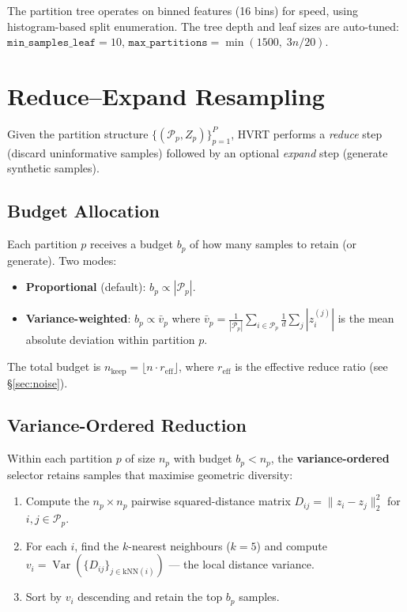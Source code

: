 \documentclass[11pt,a4paper]{article}
\newcommand{\Var}{\operatorname{Var}}
\theoremstyle{definition}
\begin{document}
The partition tree operates on binned features (16 bins) for speed, using
histogram-based split enumeration.  The tree depth and leaf sizes are
auto-tuned: $\texttt{min\_samples\_leaf} = 10$,
$\texttt{max\_partitions} = \min(1500,\; 3n / 20)$.


\section{Reduce--Expand Resampling}

Given the partition structure $\{(\mathcal{P}_p, Z_p)\}_{p=1}^{P}$, HVRT
performs a \emph{reduce} step (discard uninformative samples) followed by an
optional \emph{expand} step (generate synthetic samples).

\subsection{Budget Allocation}

Each partition $p$ receives a budget $b_p$ of how many samples to retain
(or generate).  Two modes:
\begin{itemize}[nosep]
    \item \textbf{Proportional} (default): $b_p \propto |\mathcal{P}_p|$.
    \item \textbf{Variance-weighted}: $b_p \propto \bar{v}_p$ where
        $\bar{v}_p = \frac{1}{|\mathcal{P}_p|}\sum_{i \in \mathcal{P}_p} \frac{1}{d}\sum_j |z_i^{(j)}|$
        is the mean absolute deviation within partition $p$.
\end{itemize}
The total budget is $n_{\text{keep}} = \lfloor n \cdot r_{\text{eff}} \rfloor$,
where $r_{\text{eff}}$ is the effective reduce ratio (see \S\ref{sec:noise}).

\subsection{Variance-Ordered Reduction}

Within each partition $p$ of size $n_p$ with budget $b_p < n_p$, the
\textbf{variance-ordered} selector retains samples that maximise geometric
diversity:

\begin{enumerate}[nosep]
    \item Compute the $n_p \times n_p$ pairwise squared-distance matrix
        $D_{ij} = \|z_i - z_j\|_2^2$ for $i, j \in \mathcal{P}_p$.
    \item For each $i$, find the $k$-nearest neighbours ($k = 5$) and compute
        $v_i = \Var(\{D_{ij}\}_{j \in \text{kNN}(i)})$ --- the local distance variance.
    \item Sort by $v_i$ descending and retain the top $b_p$ samples.
\end{enumerate}
\end{document}
